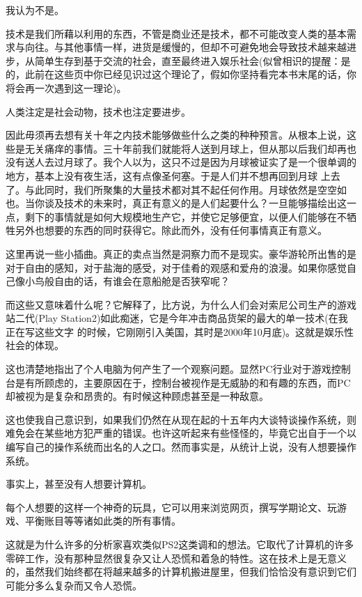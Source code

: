 我认为不是。

技术是我们所藉以利用的东西，不管是商业还是技术，都不可能改变人类的基本需求与向往。与其他事情一样，进货是缓慢的，但却不可避免地会导致技术越来越进步，从简单生存到基于交流的社会，直至最终进入娱乐社会(似曾相识的提醒：是的，此前在这些页中你已经见识过这个理论了，假如你坚持看完本书末尾的话，你将会再一次遇到这一理论)。

人类注定是社会动物，技术也注定要进步。

因此毋须再去想有关十年之内技术能够做些什么之类的种种预言。从根本上说，这些是无关痛痒的事情。三十年前我们就能将人送到月球上，但从那以后我们却再也没有送人去过月球了。我个人以为，这只不过是因为月球被证实了是一个很单调的地方，基本上没有夜生活，这有点像圣何塞。于是人们并不想再回到月球 上去了。与此同时，我们所聚集的大量技术都对其不起任何作用。月球依然是空空如也。当你谈及技术的未来时，真正有意义的是人们起要什么？一旦能够描绘出这一点，剩下的事情就是如何大规模地生产它，并使它足够便宜，以便人们能够在不牺牲另外也想要的东西的同时获得它。除此而外，没有任何事情真正有意义。

这里再说一些小插曲。真正的卖点当然是洞察力而不是现实。豪华游轮所出售的是对于自由的感知，对于盐海的感受，对于佳肴的观感和爱舟的浪漫。如果你感觉自己像小鸟般自由的话，有谁会在意船舱是否狭窄呢？

而这些又意味着什么呢？它解释了，比方说，为什么人们会对索尼公司生产的游戏站二代(Play Station2)如此痴迷，它是今年冲击商品货架的最大的单一技术(在我正在写这些文字 的时候，它刚刚引入美国，其时是2000年10月底)。这就是娱乐性社会的体现。

这也清楚地指出了个人电脑为何产生了一个观察问题。显然PC行业对于游戏控制台是有所顾虑的，主要原因在于，控制台被视作是无威胁的和有趣的东西，而PC却被视为是复杂和昂贵的。有时候这种顾虑甚至是一种敌意。

这也使我自己意识到，如果我们仍然在从现在起的十五年内大谈特谈操作系统，则难免会在某些地方犯严重的错误。也许这听起来有些怪怪的，毕竟它出自于一个以编写自己的操作系统而出名的人之口。然而事实是，从统计上说，没有人想要操作系统。

事实上，甚至没有人想要计算机。

每个人想要的这样一个神奇的玩具，它可以用来浏览网页，撰写学期论文、玩游戏、平衡账目等等诸如此类的所有事情。

这就是为什么许多的分析家喜欢类似PS2这类调和的想法。它取代了计算机的许多零碎工作，没有那种显然很复杂又让人恐慌和着急的特性。这在技术上是无意义的，虽然我们始终都在将越来越多的计算机搬进屋里，但我们恰恰没有意识到它们可能分多么复杂而又令人恐慌。

